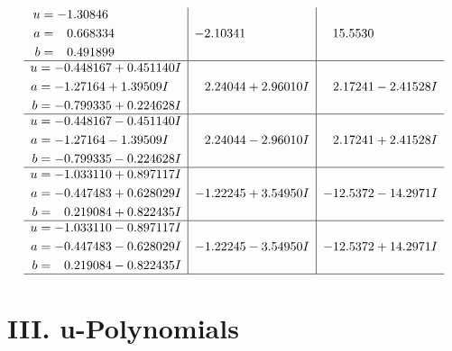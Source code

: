 \documentclass[1p]{elsarticle_modified}
\theoremstyle{definition}
\begin{document}
$$\begin{array}{c|c|c}
\begin{aligned}
u &= -1.30846\phantom{ +0.000000I} \\
a &= \phantom{-}0.668334\phantom{ +0.000000I} \\
b &= \phantom{-}0.491899\phantom{ +0.000000I}\end{aligned}
 & -2.10341\phantom{ +0.000000I} & \phantom{-}15.5530\phantom{ +0.000000I} \\ \hline\begin{aligned}
u &= -0.448167 + 0.451140 I \\
a &= -1.27164 + 1.39509 I \\
b &= -0.799335 + 0.224628 I\end{aligned}
 & \phantom{-}2.24044 + 2.96010 I & \phantom{-}2.17241 - 2.41528 I \\ \hline\begin{aligned}
u &= -0.448167 - 0.451140 I \\
a &= -1.27164 - 1.39509 I \\
b &= -0.799335 - 0.224628 I\end{aligned}
 & \phantom{-}2.24044 - 2.96010 I & \phantom{-}2.17241 + 2.41528 I \\ \hline\begin{aligned}
u &= -1.033110 + 0.897117 I \\
a &= -0.447483 + 0.628029 I \\
b &= \phantom{-}0.219084 + 0.822435 I\end{aligned}
 & -1.22245 + 3.54950 I & -12.5372 - 14.2971 I \\ \hline\begin{aligned}
u &= -1.033110 - 0.897117 I \\
a &= -0.447483 - 0.628029 I \\
b &= \phantom{-}0.219084 - 0.822435 I\end{aligned}
 & -1.22245 - 3.54950 I & -12.5372 + 14.2971 I\\
 \hline 
 \end{array}$$\newpage
\newpage\renewcommand{\arraystretch}{1}
\centering \section*{ III. u-Polynomials}
\end{document}
